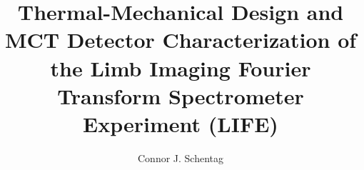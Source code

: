 \documentclass[12pt, proposal]{uofsthesis-cs}
\title{Thermal-Mechanical Design and MCT Detector Characterization of the Limb Imaging Fourier Transform Spectrometer Experiment (LIFE)}
\author{Connor J. Schentag}
\begin{document}
\maketitle

\frontmatter








%

\uofsappendix

\begin{appendices}



\end{appendices}
\end{document}
